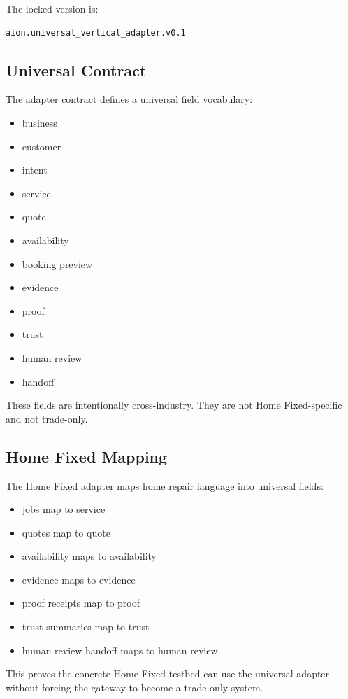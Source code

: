 \documentclass[11pt]{article}
\begin{document}
The locked version is:

\begin{verbatim}
aion.universal_vertical_adapter.v0.1
\end{verbatim}

\subsection{Universal Contract}

The adapter contract defines a universal field vocabulary:

\begin{itemize}
  \item business
  \item customer
  \item intent
  \item service
  \item quote
  \item availability
  \item booking preview
  \item evidence
  \item proof
  \item trust
  \item human review
  \item handoff
\end{itemize}

These fields are intentionally cross-industry. They are not Home Fixed-specific and not trade-only.

\subsection{Home Fixed Mapping}

The Home Fixed adapter maps home repair language into universal fields:

\begin{itemize}
  \item jobs map to service
  \item quotes map to quote
  \item availability maps to availability
  \item evidence maps to evidence
  \item proof receipts map to proof
  \item trust summaries map to trust
  \item human review handoff maps to human review
\end{itemize}

This proves the concrete Home Fixed testbed can use the universal adapter without forcing the gateway to become a trade-only system.
\end{document}
